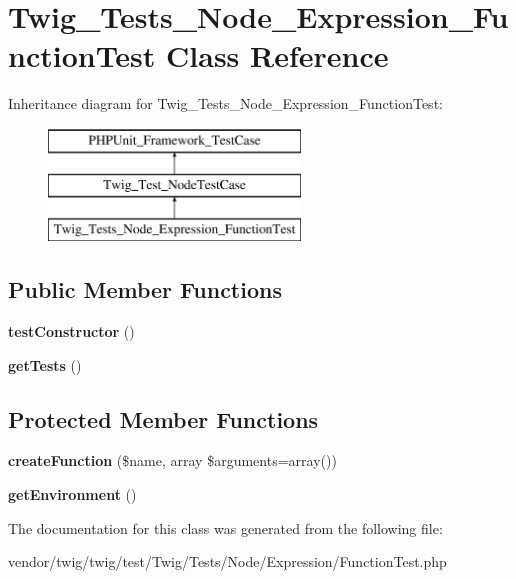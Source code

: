 \hypertarget{classTwig__Tests__Node__Expression__FunctionTest}{}\section{Twig\+\_\+\+Tests\+\_\+\+Node\+\_\+\+Expression\+\_\+\+Function\+Test Class Reference}
\label{classTwig__Tests__Node__Expression__FunctionTest}
Inheritance diagram for Twig\+\_\+\+Tests\+\_\+\+Node\+\_\+\+Expression\+\_\+\+Function\+Test\+:\begin{figure}[H]
\begin{center}
\leavevmode
\includegraphics[height=3.000000cm]{classTwig__Tests__Node__Expression__FunctionTest}
\end{center}
\end{figure}
\subsection*{Public Member Functions}
\begin{DoxyCompactItemize}
\item 
{\bfseries test\+Constructor} ()\hypertarget{classTwig__Tests__Node__Expression__FunctionTest_a758ac22bbe8d36b30f5a04c36141275a}{}\label{classTwig__Tests__Node__Expression__FunctionTest_a758ac22bbe8d36b30f5a04c36141275a}

\item 
{\bfseries get\+Tests} ()\hypertarget{classTwig__Tests__Node__Expression__FunctionTest_a0041bb19056c120ae57b219a3fc7702a}{}\label{classTwig__Tests__Node__Expression__FunctionTest_a0041bb19056c120ae57b219a3fc7702a}

\end{DoxyCompactItemize}
\subsection*{Protected Member Functions}
\begin{DoxyCompactItemize}
\item 
{\bfseries create\+Function} (\$name, array \$arguments=array())\hypertarget{classTwig__Tests__Node__Expression__FunctionTest_a682553f94dfcf637e66521e8dff1aa82}{}\label{classTwig__Tests__Node__Expression__FunctionTest_a682553f94dfcf637e66521e8dff1aa82}

\item 
{\bfseries get\+Environment} ()\hypertarget{classTwig__Tests__Node__Expression__FunctionTest_abf1e5a27e11f2689767237c718ceec00}{}\label{classTwig__Tests__Node__Expression__FunctionTest_abf1e5a27e11f2689767237c718ceec00}

\end{DoxyCompactItemize}


The documentation for this class was generated from the following file\+:\begin{DoxyCompactItemize}
\item 
vendor/twig/twig/test/\+Twig/\+Tests/\+Node/\+Expression/Function\+Test.\+php\end{DoxyCompactItemize}
